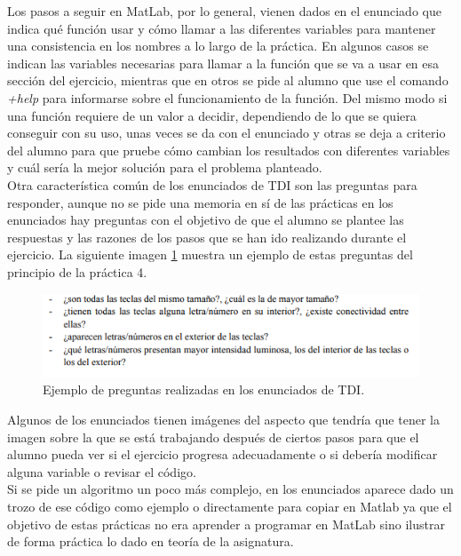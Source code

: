 \documentclass[a4paper,12pt]{report}
\begin{document}
Los pasos a seguir en MatLab, por lo general, vienen dados en el enunciado que indica qué función usar y cómo llamar a las diferentes variables para mantener una consistencia en los nombres a lo largo de la práctica. En algunos casos se indican las variables necesarias para llamar a la función que se va a usar en esa sección del ejercicio, mientras que en otros se pide al alumno que use el comando \textsl{+help} para informarse sobre el funcionamiento de la función. Del mismo modo si una función requiere de un valor a decidir, dependiendo de lo que se quiera conseguir con su uso, unas veces se da con el enunciado y otras se deja a criterio del alumno para que pruebe cómo cambian los resultados con diferentes variables y cuál sería la mejor solución para el problema planteado.\\

Otra característica común de los enunciados de TDI son las preguntas para responder, aunque no se pide una memoria en sí de las prácticas en los enunciados hay preguntas con el objetivo de que el alumno se plantee las respuestas y las razones de los pasos que se han ido realizando durante el ejercicio.  La siguiente imagen \ref{preguntasp4} muestra un ejemplo de estas preguntas del principio de la práctica 4.

\begin{figure}[h]
\centering
\includegraphics[width=1\textwidth]{imagenes/preguntasp4}
\caption{Ejemplo de preguntas realizadas en los enunciados de TDI.}
\label{preguntasp4}
\end{figure}

Algunos de los enunciados tienen imágenes del aspecto que tendría que tener la imagen sobre la que se está trabajando después de ciertos pasos para que el alumno pueda ver si el ejercicio progresa adecuadamente o si debería modificar alguna variable o revisar el código.\\

Si se pide un algoritmo un poco más complejo, en los enunciados aparece dado un trozo de ese código como ejemplo o directamente para copiar en Matlab ya que el objetivo de estas prácticas no era aprender a programar en MatLab sino ilustrar de forma práctica lo dado en teoría de la asignatura.\\
\end{document}
